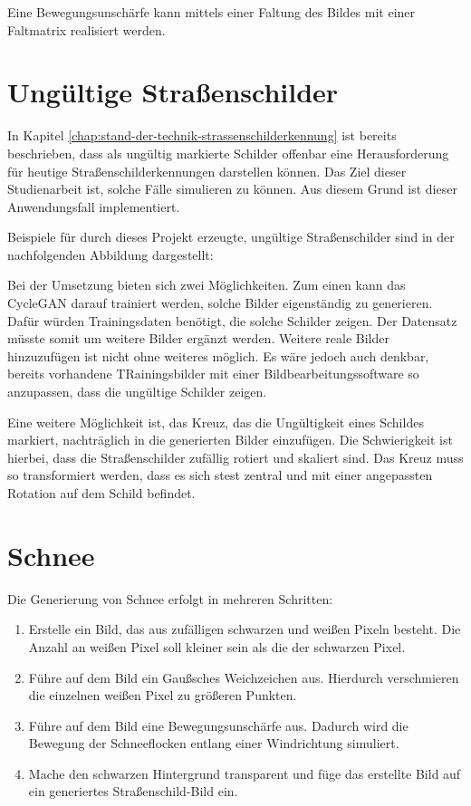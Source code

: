 Eine Bewegungsunschärfe kann mittels einer Faltung des Bildes mit einer Faltmatrix realisiert werden.

\section{Ungültige Straßenschilder}
In Kapitel \ref{chap:stand-der-technik-strassenschilderkennung} ist bereits beschrieben, dass als ungültig markierte Schilder offenbar eine Herausforderung für heutige Straßenschilderkennungen darstellen können. Das Ziel dieser Studienarbeit ist, solche Fälle simulieren zu können. Aus diesem Grund ist dieser Anwendungsfall implementiert.

Beispiele für durch dieses Projekt erzeugte, ungültige Straßenschilder sind in der nachfolgenden Abbildung dargestellt:

Bei der Umsetzung bieten sich zwei Möglichkeiten. Zum einen kann das \ac{CycleGAN} darauf trainiert werden, solche Bilder eigenständig zu generieren. Dafür würden Trainingsdaten benötigt, die solche Schilder zeigen. Der Datensatz müsste somit um weitere Bilder ergänzt werden. Weitere reale Bilder hinzuzufügen ist nicht ohne weiteres möglich. Es wäre jedoch auch denkbar, bereits vorhandene TRainingsbilder mit einer Bildbearbeitungssoftware so anzupassen, dass die ungültige Schilder zeigen.

Eine weitere Möglichkeit ist, das Kreuz, das die Ungültigkeit eines Schildes markiert, nachträglich in die generierten Bilder einzufügen. Die Schwierigkeit ist hierbei, dass die Straßenschilder zufällig rotiert und skaliert sind. Das Kreuz muss so transformiert werden, dass es sich stest zentral und mit einer angepassten Rotation auf dem Schild befindet.

\section{Schnee}
Die Generierung von Schnee erfolgt in mehreren Schritten:
\begin{enumerate}
  \item Erstelle ein Bild, das aus zufälligen schwarzen und weißen Pixeln besteht. Die Anzahl an weißen Pixel soll kleiner sein als die der schwarzen Pixel.
  \item Führe auf dem Bild ein Gaußsches Weichzeichen aus. Hierdurch verschmieren die einzelnen weißen Pixel zu größeren Punkten.
  \item Führe auf dem Bild eine Bewegungsunschärfe aus. Dadurch wird die Bewegung der Schneeflocken entlang einer Windrichtung simuliert.
  \item Mache den schwarzen Hintergrund transparent und füge das erstellte Bild auf ein generiertes Straßenschild-Bild ein.
\end{enumerate}

